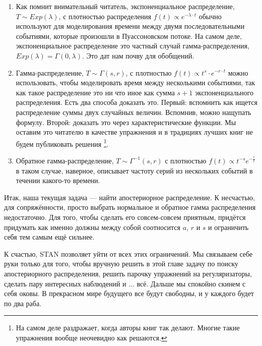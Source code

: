 \documentclass[12pt, a4paper, oneside]{extreport}
\theoremstyle{plain}              %
\theoremstyle{definition}         %
\begin{document}
\begin{enumerate}
	\item Как помнит внимательный читатель, экспоненциальное распределение, $T \sim Exp(\lambda)$, с плотностью распределения $f(t) \propto e^{-\lambda \cdot t}$ обычно используют для моделирования времени между двумя последовательными событиями, которые произошли в Пуассоновском потоке. На самом деле, экспоненциальное распределение это частный случай гамма-распределения, $Exp(\lambda) = \Gamma(0, \lambda)$. Это дат нам почву для обобщений. 
	
	\item Гамма-распределение, $T \sim \Gamma(s,r)$, с плотностью $f(t) \propto t^s \cdot e^{-r \cdot t}$  можно использовать, чтобы моделировать время между несколькими событиями, так как такое распределение это ни что иное как сумма $s+1$ экспоненциального распределения. Есть два способа доказать это. Первый: вспомнить как ищется распределение суммы двух случайных величин. Вспомнив, можно нащупать формулу. Второй: доказать это через характеристические функции. Мы оставим это читателю в качестве упражнения и в традициях лучших книг не будем публиковать решения \footnote{На самом деле раздражает, когда авторы книг так делают. Многие такие упражнения вообще неочевидно как решаются.}.
	
	\item Обратное гамма-распределение, $T \sim \Gamma^{-1}(s,r)$ с плотностью $f(t) \propto t^{-s} e^{-\frac{r}{t}}$ в таком случае, наверное, описывает частоту серий из нескольких событий в течении какого-то времени.
\end{enumerate}


Итак, наша текущая задача --- найти апостериорное распределение. К несчастью, для сопряжённости, просто выбрать нормальное и обратное гамма распределения недостаточно. Для того, чтобы сделать его совсем-совсем приятным, придётся придумать как именно должны между собой соотносится $a$, $r$ и $s$ и ограничить себя тем самым ещё сильнее. 

К счастью, STAN позволяет уйти от всех этих ограничений. Мы связываем себе руки только для того, чтобы вручную решить в этой главе задачу по поиску апостериорного распределения, решить парочку упражнений на регуляризаторы, сделать пару интересных наблюдений и ... всё. Дальше мы спокойно скинем с себя оковы. В прекрасном мире будущего все будут свободны, и у каждого будет по два раба.
\end{document}
